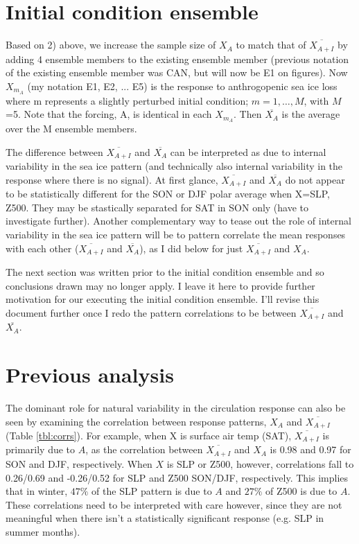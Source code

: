 \documentclass[12pt]{article}
\begin{document}
\section{Initial condition ensemble}
Based on 2) above, we increase the sample size of ${X_{A}}$ to match that of $\overline{X_{A+I}}$ by adding 4 ensemble members to the existing ensemble member (previous notation of the existing ensemble member was CAN, but will now be E1 on figures). Now $X_{m_A}$ (my notation E1, E2, ... E5) is the response to anthrogopenic sea ice loss where m represents a slightly perturbed initial condition; $m=1,\ldots,M$, with $M$=5. Note that the forcing, A, is identical in each $X_{m_A}$. Then $\overline{X_{A}}$ is the average over the M ensemble members.

The difference between $\overline{X_{A+I}}$ and $\overline{X_{A}}$ can be interpreted as due to internal variability in the sea ice pattern (and technically also internal variability in the response where there is no signal). At first glance, $\overline{X_{A+I}}$ and $\overline{X_{A}}$ do not appear to be statistically different for the SON or DJF polar average when X=SLP, Z500. They may be stastically separated for SAT in SON only (have to investigate further). Another complementary way to tease out the role of internal variability in the sea ice pattern will be to pattern correlate the mean responses with each other ($\overline{X_{A+I}}$ and $\overline{X_{A}}$), as I did below for just $\overline{X_{A+I}}$ and $X_A$.

The next section was written prior to the initial condition ensemble and so conclusions drawn may no longer apply. I leave it here to provide further motivation for our executing the initial condition ensemble. I'll revise this document further once I redo the pattern correlations to be between $\overline{X_{A+I}}$ and $\overline{X_{A}}$.


\section{Previous analysis}

The dominant role for natural variability in the circulation response can also be seen by examining the correlation between response patterns, $X_A$ and $\overline{X_{A+I}}$ (Table \ref{tbl:corrs}). For example, when X is surface air temp (SAT), $\overline{X_{A+I}}$ is primarily due to $A$, as the correlation between $\overline{X_{A+I}}$ and $X_A$ is 0.98 and 0.97 for SON and DJF, respectively. When $X$ is SLP or Z500, however, correlations fall to 0.26/0.69 and -0.26/0.52 for SLP and Z500 SON/DJF, respectively. This implies that in winter, $47\%$ of the SLP pattern is due to $A$ and $27\%$ of Z500 is due to $A$. These correlations need to be interpreted with care however, since they are not meaningful when there isn't a statistically significant response (e.g. SLP in summer months).
\end{document}
